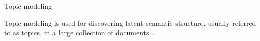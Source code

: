 \begin{frame}{Topic modeling}
    \begin{definition}
        Topic modeling is used for discovering latent semantic structure, usually referred to as topics, in a large collection of documents~\parencite{top2vec_2020}.
    \end{definition}
\end{frame}